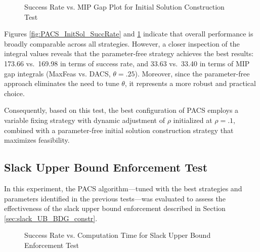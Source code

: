 \begin{figure}[H]
    \centering
    \begin{minipage}{0.6\columnwidth}
        \centering
        \resizebox{\linewidth}{!}{}
    \end{minipage}%
    \hfill
    \begin{minipage}{0.4\columnwidth}
        \centering
        \resizebox{\linewidth}{!}{}
    \end{minipage}
    \caption{Success Rate vs. MIP Gap Plot for Initial Solution Construction Test}
    \label{fig:PACS_InitSol_MGAP}
\end{figure}
Figures \ref{fig:PACS_InitSol_SuccRate} and \ref{fig:PACS_InitSol_MGAP} indicate that overall performance is broadly comparable across all strategies. However, a closer inspection of the integral values reveals that the parameter-free strategy achieves the best results: 173.66 vs.\ 169.98 in terms of success rate, and 33.63 vs.\ 33.40 in terms of MIP gap integrals (MaxFeas vs. DACS, $\theta=.25$). Moreover, since the parameter-free approach eliminates the need to tune $\theta$, it represents a more robust and practical choice.

Consequently, based on this test, the best configuration of PACS employs a variable fixing strategy with dynamic adjustment of $\rho$ initialized at $\rho = .1$, combined with a parameter-free initial solution construction strategy that maximizes feasibility.

\subsection{Slack Upper Bound Enforcement Test}\label{sec:test_slack_UB}
In this experiment, the PACS algorithm—tuned with the best strategies and parameters identified in the previous tests—was evaluated to assess the effectiveness of the slack upper bound enforcement described in Section \ref{sec:slack_UB_BDG_constr}.

\begin{figure}[H]
\centering
\begin{minipage}{0.6\columnwidth}
\centering
\resizebox{\linewidth}{!}{}
\end{minipage}%
\hfill
\begin{minipage}{0.4\columnwidth}
\centering
\resizebox{\linewidth}{!}{}
\end{minipage}
\caption{Success Rate vs. Computation Time for Slack Upper Bound Enforcement Test}
\label{fig:PACS_FixSlack_SuccRate}
\end{figure}

